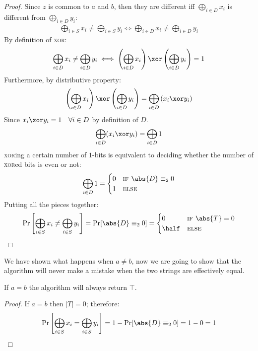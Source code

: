 \begin{proof}
    Since $z$ is common to $a$ and $b$, then they are different iff $\bigoplus_{i \in D} x_i$ is different from $\bigoplus_{i \in D} y_i$:
    \begin{align}
        \bigoplus_{i \in S} x_i \neq \bigoplus_{i \in S} y_i \iff \bigoplus_{i \in D} x_i \neq \bigoplus_{i \in D} y_i 
    \end{align}
    By definition of \textsc{xor}:
    \begin{align}
        \bigoplus_{i \in D} x_i \neq \bigoplus_{i \in D} y_i \iff \left(\bigoplus_{i \in D} x_i\right) \xor \left(\bigoplus_{i \in D} y_i\right) = 1
    \end{align}
    Furthermore, by distributive property:
    \begin{align}
        \left(\bigoplus_{i \in D} x_i\right) \xor \left(\bigoplus_{i \in D} y_i\right) = \bigoplus_{i \in D}\left( x_i \xor y_i \right)
    \end{align}
    Since $x_i \xor y_i = 1 \quad \forall i \in D$ by definition of $D$.
    \begin{align}
        \bigoplus_{i \in D}( x_i \xor y_i ) = \bigoplus_{i \in D} 1
    \end{align}
    \textsc{xor}ing a certain number of $1$-bits is equivalent to deciding whether the number of \textsc{xor}ed bits is even or not:
    \begin{align}
        \bigoplus_{i \in D} 1 = 
        \begin{cases}
            0 & \textsc{if } \abs{D} \equiv_2 0 \\
            1 & \textsc{else}
        \end{cases}
    \end{align}
    Putting all the pieces together:
    \begin{align}
        \Pr \left[ \bigoplus_{i \in S} x_i \neq \bigoplus_{i \in S} y_i \right] = \Pr[\abs{D} \equiv_2 0] = 
        \begin{cases}
            0 & \textsc{if } \abs{T} = 0 \\
            \half & \textsc{else}
        \end{cases}
    \end{align}
\end{proof}

We have shown what happens when $a \neq b$, now we are going to show that the algorithm will never make a mistake when the two strings are effectively equal.

\begin{claim}
    If $a = b$ the algorithm will always return $\top$.
\end{claim}
\begin{proof}
    If $a = b$ then $|T| = 0$; therefore:
    \[
        \Pr \left[ \bigoplus_{i \in S} x_i = \bigoplus_{i \in S} y_i \right] = 1 - \Pr[\abs{D} \equiv_2 0] = 1 - 0 = 1
    \] 
\end{proof}
    


